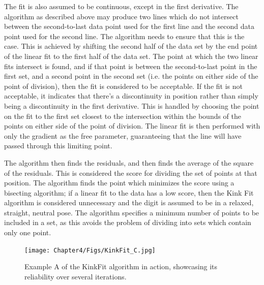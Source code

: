 The fit is also assumed to be continuous, except in the first derivative. The algorithm as described above may produce two lines which do not intersect between the second-to-last data point used for the first line and the second data point used for the second line. The algorithm needs to ensure that this is the case. This is achieved by shifting the second half of the data set by the end point of the linear fit to the first half of the data set. The point at which the two linear fits intersect is found, and if that point is between the second-to-last point in the first set, and a second point in the second set (i.e. the points on either side of the point of division), then the fit is considered to be acceptable. If the fit is not acceptable, it indicates that there's a discontinuity in position rather than simply being a discontinuity in the first derivative. This is handled by choosing the point on the fit to the first set closest to the intersection within the bounds of the points on either side of the point of division. The linear fit is then performed with only the gradient as the free parameter, guaranteeing that the line will have passed through this limiting point.

The algorithm then finds the residuals, and then finds the average of the square of the residuals. This is considered the score for dividing the set of points at that position. The algorithm finds the point which minimizes the score using a bisecting algorithm; if a linear fit to the data has a low score, then the Kink Fit algorithm is considered unnecessary and the digit is assumed to be in a relaxed, straight, neutral pose. The algorithm specifies a minimum number of points to be included in a set, as this avoids the problem of dividing into sets which contain only one point.



\begin{figure}[h!]
  \centering
    \texttt{[image: Chapter4/Figs/KinkFit\_C.jpg]}
    \caption{Example A of the KinkFit algorithm in action, showcasing its reliability over several iterations.}\label{fig:KinkFitC}
\end{figure}

